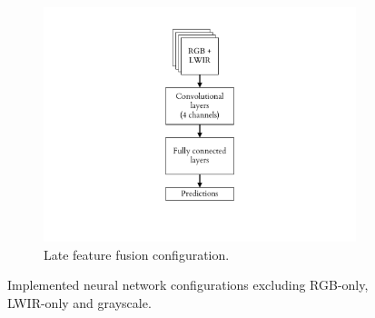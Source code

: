 \documentclass{l4proj}
\begin{document}
\begin{figure}[ht]
\begin{subfigure}[h!]{0.3\textwidth}
    \includegraphics[width=\textwidth, page={3}, trim={6.5cm 2.2cm 6.5cm 1.5cm}, clip]{images/models/archs}
    \caption{Late feature fusion configuration.}
    \label{fig:arch_fusion}
  \end{subfigure}
  \caption{Implemented neural network configurations excluding RGB-only, LWIR-only and grayscale.}
  \label{fig:archs}
\end{figure}
\end{document}
